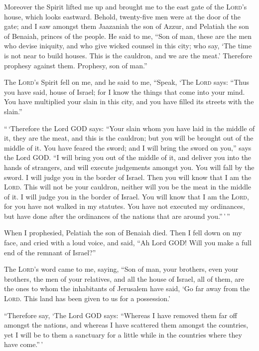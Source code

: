  Moreover the Spirit lifted me up and brought me to the
east gate of the \textsc{Lord}'s house, which looks eastward. Behold,
twenty-five men were at the door of the gate; and I saw amongst them
Jaazaniah the son of Azzur, and Pelatiah the son of Benaiah, princes of
the people.  He said to me, ``Son of man, these are the
men who devise iniquity, and who give wicked counsel in this city;
 who say, `The time is not near to build houses. This is
the cauldron, and we are the meat.'  Therefore prophesy
against them. Prophesy, son of man.''

 The \textsc{Lord}'s Spirit fell on me, and he said to me,
``Speak, `The \textsc{Lord} says: ``Thus you have said, house of Israel;
for I know the things that come into your mind.  You have
multiplied your slain in this city, and you have filled its streets with
the slain.''

 ``\,`Therefore the Lord GOD says: ``Your slain whom you
have laid in the middle of it, they are the meat, and this is the
cauldron; but you will be brought out of the middle of it.
 You have feared the sword; and I will bring the sword on
you,'' says the Lord GOD.  ``I will bring you out of the
middle of it, and deliver you into the hands of strangers, and will
execute judgements amongst you.  You will fall by the
sword. I will judge you in the border of Israel. Then you will know that
I am the \textsc{Lord}.  This will not be your cauldron,
neither will you be the meat in the middle of it. I will judge you in
the border of Israel.  You will know that I am the
\textsc{Lord}, for you have not walked in my statutes. You have not
executed my ordinances, but have done after the ordinances of the
nations that are around you.''\,'\,''

 When I prophesied, Pelatiah the son of Benaiah died.
Then I fell down on my face, and cried with a loud voice, and said, ``Ah
Lord GOD! Will you make a full end of the remnant of Israel?''

 The \textsc{Lord}'s word came to me, saying,
 ``Son of man, your brothers, even your brothers, the men
of your relatives, and all the house of Israel, all of them, are the
ones to whom the inhabitants of Jerusalem have said, `Go far away from
the \textsc{Lord}. This land has been given to us for a possession.'

 ``Therefore say, `The Lord GOD says: ``Whereas I have
removed them far off amongst the nations, and whereas I have scattered
them amongst the countries, yet I will be to them a sanctuary for a
little while in the countries where they have come.''\,'


